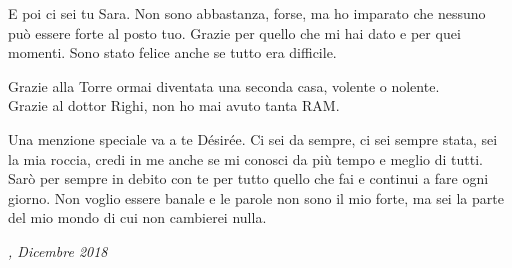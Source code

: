 \vspace*{0.4cm}

\noindent
E poi ci sei tu Sara. Non sono abbastanza, forse, ma ho imparato che nessuno può
essere forte al posto tuo. Grazie per quello che mi hai dato e per quei momenti.
Sono stato felice anche se tutto era difficile.

\vspace*{0.4cm}

\noindent
Grazie alla Torre ormai diventata una seconda casa, volente o nolente.\\
Grazie al dottor Righi, non ho mai avuto tanta RAM.
\vspace*{0.4cm}

\noindent
Una menzione speciale va a te Désirée. Ci sei da sempre, ci sei sempre stata,
sei la mia roccia, credi in me anche se mi conosci da più tempo e meglio di
tutti. Sarò per sempre in debito con te per tutto quello che fai e continui a
fare ogni giorno. Non voglio essere banale e le parole non sono il mio forte,
ma sei la parte del mio mondo di cui non cambierei nulla.

\vspace*{0.4cm}
\noindent\textit{\myLocation, Dicembre 2018}
\hfill \textit{\myName}

\endgroup
